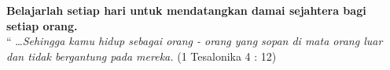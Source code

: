 \begin{center}
\textbf{Belajarlah setiap hari untuk mendatangkan damai sejahtera bagi setiap orang.}\\
`` \ldots \textit{Sehingga kamu hidup sebagai orang - orang yang sopan di mata orang luar dan tidak bergantung pada mereka.} (1 Tesalonika 4 : 12)
\end{center}

\normalsize